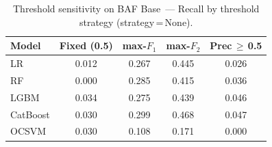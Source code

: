 \begin{table}[ht]
\centering
\caption{Threshold sensitivity on BAF Base~--- Recall by threshold strategy (strategy\,=\,None).}
\label{tab:threshold_baf_recall}
\begin{tabular}{l c c c c}
\toprule
Model & Fixed (0.5) & max-$F_1$ & max-$F_2$ & Prec\,$\geq$\,0.5 \\
\midrule
LR         & 0.012 & 0.267 & 0.445 & 0.026 \\
RF         & 0.000 & 0.285 & 0.415 & 0.036 \\
LGBM       & 0.034 & 0.275 & 0.439 & 0.046 \\
CatBoost   & 0.030 & 0.299 & 0.468 & 0.047 \\
OCSVM      & 0.030 & 0.108 & 0.171 & 0.000 \\
\bottomrule
\end{tabular}
\end{table}